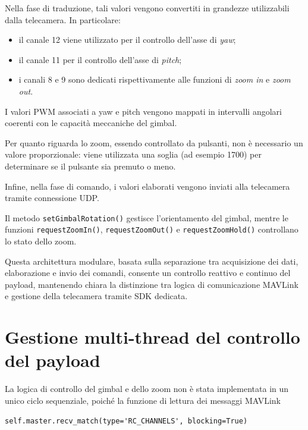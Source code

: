 \medskip
\noindent
Nella fase di traduzione, tali valori vengono convertiti in grandezze utilizzabili dalla telecamera. In particolare:

\begin{itemize}
    \item il canale 12 viene utilizzato per il controllo dell’asse di \textit{yaw};
    \item il canale 11 per il controllo dell’asse di \textit{pitch};
    \item i canali 8 e 9 sono dedicati rispettivamente alle funzioni di \textit{zoom in} e \textit{zoom out}.
\end{itemize}

\medskip
\noindent
I valori PWM associati a yaw e pitch vengono mappati in intervalli angolari coerenti con le capacità meccaniche del gimbal.

\medskip
\noindent
Per quanto riguarda lo zoom, essendo controllato da pulsanti, non è necessario un valore proporzionale: viene utilizzata una soglia (ad esempio 1700) per determinare se il pulsante sia premuto o meno.

\medskip
\noindent
Infine, nella fase di comando, i valori elaborati vengono inviati alla telecamera tramite connessione UDP.

\medskip
\noindent
Il metodo \texttt{setGimbalRotation()} gestisce l’orientamento del gimbal, mentre le funzioni \texttt{requestZoomIn()}, \texttt{requestZoomOut()} e \texttt{requestZoomHold()} controllano lo stato dello zoom.

\medskip
\noindent
Questa architettura modulare, basata sulla separazione tra acquisizione dei dati, elaborazione e invio dei comandi, consente un controllo reattivo e continuo del payload, mantenendo chiara la distinzione tra logica di comunicazione MAVLink e gestione della telecamera tramite SDK dedicata.

\bigskip
\noindent \textbf
\bigskip

\section{Gestione multi-thread del controllo del payload}

\bigskip

La logica di controllo del gimbal e dello zoom non è stata implementata in un unico ciclo sequenziale,
poiché la funzione di lettura dei messaggi MAVLink

\begin{verbatim}
self.master.recv_match(type='RC_CHANNELS', blocking=True)
\end{verbatim}

